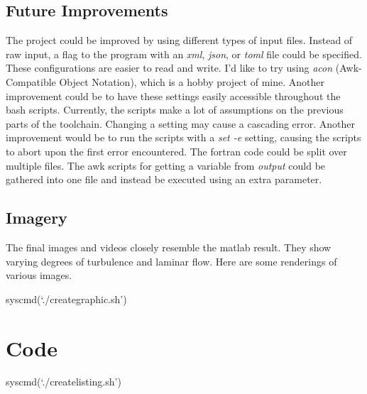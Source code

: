 \documentclass[listof=totoc]{report}
\begin{document}
\section{Future Improvements}
The project could be improved by using different types of input files. Instead of raw input, a flag to the program with an \emph{xml}, \emph{json}, or \emph{toml} file could be specified. These configurations are easier to read and write. I'd like to try using \emph{acon} (Awk-Compatible Object Notation), which is a hobby project of mine.
Another improvement could be to have these settings easily accessible throughout the bash scripts. Currently, the scripts make a lot of assumptions on the previous parts of the toolchain. Changing a setting may cause a cascading error. Another improvement would be to run the scripts with a \emph{set -e} setting, causing the scripts to abort upon the first error encountered. The fortran code could be split over multiple files. The awk scripts for getting a variable from \emph{output} could be gathered into one file and instead be executed using an extra parameter.

\section{Imagery}
The final images and videos closely resemble the matlab result. They show varying degrees of turbulence and laminar flow.
Here are some renderings of various images.

syscmd(`./creategraphic.sh')

\chapter{Code}
syscmd(`./createlisting.sh')
\end{document}
